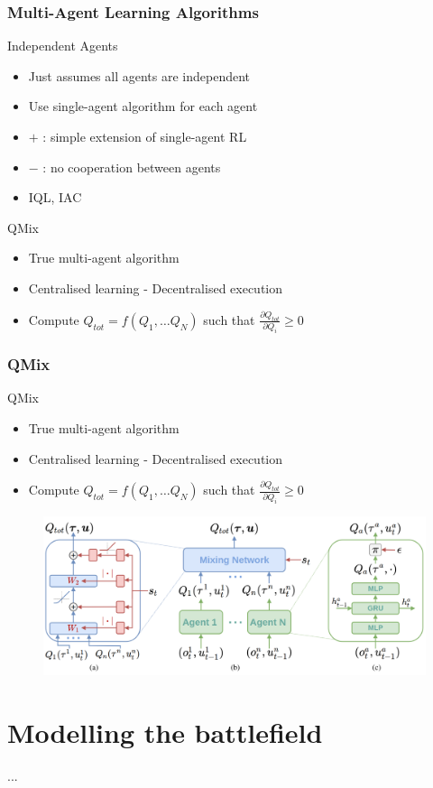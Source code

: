\documentclass{beamer}
\begin{document}
\begin{frame}
\frametitle{Multi-Agent Learning Algorithms}
\begin{block}{Independent Agents}
\begin{itemize}
    \item Just assumes all agents are independent
    \item Use single-agent algorithm for each agent
    \item $+$ : simple extension of single-agent RL
    \item $-$ : no cooperation between agents
    \item IQL, IAC
\end{itemize}
\end{block}
\begin{block}{QMix}
\begin{itemize}
    \item True multi-agent algorithm
    \item Centralised learning - Decentralised execution
    \item Compute $Q_{tot} = f(Q_1, \dots Q_N)$ such that $\frac{\partial Q_{tot}}{\partial Q_i} \geq 0$
\end{itemize}
\end{block}
\end{frame}

\begin{frame}
\frametitle{QMix}
\begin{block}{QMix}
\begin{itemize}
    \item True multi-agent algorithm
    \item Centralised learning - Decentralised execution
    \item Compute $Q_{tot} = f(Q_1, \dots Q_N)$ such that $\frac{\partial Q_{tot}}{\partial Q_i} \geq 0$
\end{itemize}
\end{block}
\begin{figure}[htp]
    \centering
    \includegraphics[scale=0.2]{images/qmix_structure.png}
\end{figure}
\end{frame}

\section{Modelling the battlefield}
\begin{frame}
...
\end{frame}
\end{document}
